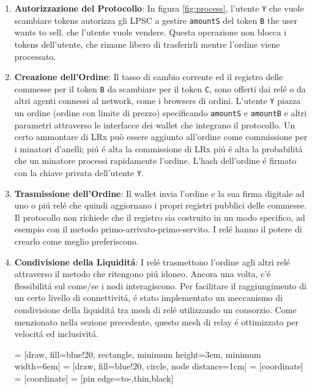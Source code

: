 \documentclass[UTF8,nofonts]{article}
\makeatletter
\newenvironment{figurehere}
 {\def\@captype{figure}}
 {}
\makeatother
\begin{document}
\begin{multicols}{2}
\begin{enumerate}


\item \textbf{Autorizzazione del Protocollo}: In figura \ref{fig:process}, l'utente \verb|Y| che vuole scambiare tokens autorizza gli LPSC a gestire \verb|amountS| del token \verb|B| the user wants to sell. che l'utente vuole vendere. Questa operazione non blocca i tokens dell'utente, che rimane libero di trasferirli mentre l'ordine viene processato.

\item \textbf{Creazione dell'Ordine}: Il tasso di cambio corrente ed il registro delle commesse per il token \verb|B| da scambiare per il token \verb|C|,  sono offerti dai rel\'e o da altri agenti connessi al network, come i browsers di ordini. L'utente \verb|Y| piazza un ordine (ordine con limite di prezzo) specificando \verb|amountS| e \verb|amountB| e altri parametri attraverso le interfacce dei wallet che integrano il protocollo. Un certo ammontare di LRx può essere aggiunto all'ordine come commissione per i minatori d'anelli; pi\'u \'e alta la commissione di LRx pi\'u \'e alta la probabilit\'a che un minatore processi rapidamente l'ordine. L'hash dell'ordine \'e firmato con la chiave privata dell'utente \verb|Y|.

\item \textbf{Trasmissione dell'Ordine}: Il wallet invia l'ordine e la sua firma digitale ad uno o pi\'u rel\'e che quindi aggiornano i propri registri pubblici delle commesse. Il protocollo non richiede che il registro sia costruito in un modo specifico, ad esempio con il metodo primo-arrivato-primo-servito. I rel\'e hanno il potere di crearlo come meglio preferiscono.

\item \textbf{Condivisione della Liquidit\'a}: I rel\'e trasmettono l'ordine agli altri rel\'e attraverso il metodo che ritengono pi\'u idoneo. Ancora una volta, c'\'e flessibilit\'a sul come/se i nodi interagiscono. Per facilitare il raggiungimento di un certo livello di connettivit\'a, \'e stato implementato un meccanismo di condivisione della liquidit\'a tra mesh di rel\'e utilizzando un consorzio. Come menzionato nella sezione precedente, questo mesh di relay \'e ottimizzato per velocit\'a ed inclusivit\'a.


\begin{center}
\begin{figurehere}
\centering
{} = [draw, fill=blue!20, rectangle,
    minimum height=3em, minimum width=6em]
 = [draw, fill=blue!20, circle, node distance=1cm]
 = [coordinate]
 = [coordinate]
 = [pin edge={to-,thin,black}]


\end{figurehere}
\end{center}
\end{enumerate}
\end{multicols}
\end{document}
